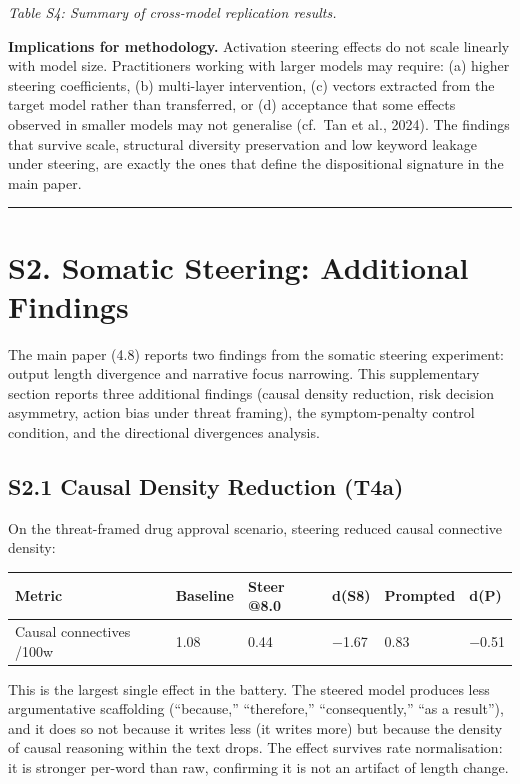 \documentclass[11pt,a4paper]{article}
\begin{document}
\emph{Table S4: Summary of cross-model replication results.}

\textbf{Implications for methodology.} Activation steering effects do not scale linearly with model size. Practitioners working with larger models may require: (a) higher steering coefficients, (b) multi-layer intervention, (c) vectors extracted from the target model rather than transferred, or (d) acceptance that some effects observed in smaller models may not generalise (cf.~Tan et al., 2024). The findings that survive scale, structural diversity preservation and low keyword leakage under steering, are exactly the ones that define the dispositional signature in the main paper.

\begin{center}\rule{0.5\linewidth}{0.5pt}\end{center}

\section*{S2. Somatic Steering: Additional Findings}

The main paper (4.8) reports two findings from the somatic steering experiment: output length divergence and narrative focus narrowing. This supplementary section reports three additional findings (causal density reduction, risk decision asymmetry, action bias under threat framing), the symptom-penalty control condition, and the directional divergences analysis.

\subsection*{S2.1 Causal Density Reduction (T4a)}

On the threat-framed drug approval scenario, steering reduced causal connective density:

\begin{longtable}[]{@{}llllll@{}}
\toprule\noalign{}
Metric & Baseline & Steer @8.0 & d(S8) & Prompted & d(P) \\
\midrule\noalign{}
\endhead
\bottomrule\noalign{}
\endlastfoot
Causal connectives /100w & 1.08 & 0.44 & −1.67 & 0.83 & −0.51 \\
\end{longtable}

This is the largest single effect in the battery. The steered model produces less argumentative scaffolding (``because,'' ``therefore,'' ``consequently,'' ``as a result''), and it does so not because it writes less (it writes more) but because the density of causal reasoning within the text drops. The effect survives rate normalisation: it is stronger per-word than raw, confirming it is not an artifact of length change.
\end{document}
